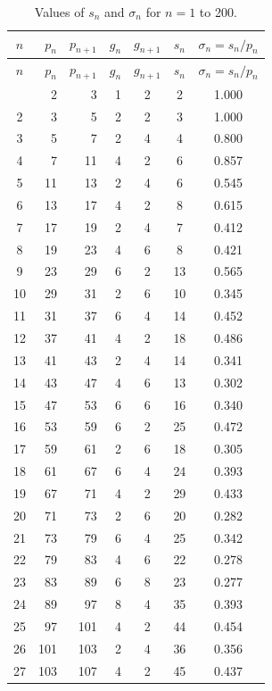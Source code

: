 \documentclass[12pt]{article}
\theoremstyle{plain}
\theoremstyle{definition}
\theoremstyle{remark}
\begin{document}
\begin{center}
\begin{small}
\begin{longtable}{@{}crrrccc@{}}
\caption{Values of $s_n$ and $\sigma_n$ for $n=1$ to 200.} \label{tab:data} \\
\toprule
$n$ & $p_n$ & $p_{n+1}$ & $g_n$ & $g_{n+1}$ & $s_n$ & $\sigma_n = s_n/p_n$ \\
\midrule
\endfirsthead
\toprule
$n$ & $p_n$ & $p_{n+1}$ & $g_n$ & $g_{n+1}$ & $s_n$ & $\sigma_n = s_n/p_n$ \\
\midrule
\endhead
\bottomrule
\endfoot
1 & 2 & 3 & 1 & 2 & 2 & 1.000 \\
2 & 3 & 5 & 2 & 2 & 3 & 1.000 \\
3 & 5 & 7 & 2 & 4 & 4 & 0.800 \\
4 & 7 & 11 & 4 & 2 & 6 & 0.857 \\
5 & 11 & 13 & 2 & 4 & 6 & 0.545 \\
6 & 13 & 17 & 4 & 2 & 8 & 0.615 \\
7 & 17 & 19 & 2 & 4 & 7 & 0.412 \\
8 & 19 & 23 & 4 & 6 & 8 & 0.421 \\
9 & 23 & 29 & 6 & 2 & 13 & 0.565 \\
10 & 29 & 31 & 2 & 6 & 10 & 0.345 \\
11 & 31 & 37 & 6 & 4 & 14 & 0.452 \\
12 & 37 & 41 & 4 & 2 & 18 & 0.486 \\
13 & 41 & 43 & 2 & 4 & 14 & 0.341 \\
14 & 43 & 47 & 4 & 6 & 13 & 0.302 \\
15 & 47 & 53 & 6 & 6 & 16 & 0.340 \\
16 & 53 & 59 & 6 & 2 & 25 & 0.472 \\
17 & 59 & 61 & 2 & 6 & 18 & 0.305 \\
18 & 61 & 67 & 6 & 4 & 24 & 0.393 \\
19 & 67 & 71 & 4 & 2 & 29 & 0.433 \\
20 & 71 & 73 & 2 & 6 & 20 & 0.282 \\
21 & 73 & 79 & 6 & 4 & 25 & 0.342 \\
22 & 79 & 83 & 4 & 6 & 22 & 0.278 \\
23 & 83 & 89 & 6 & 8 & 23 & 0.277 \\
24 & 89 & 97 & 8 & 4 & 35 & 0.393 \\
25 & 97 & 101 & 4 & 2 & 44 & 0.454 \\
26 & 101 & 103 & 2 & 4 & 36 & 0.356 \\
27 & 103 & 107 & 4 & 2 & 45 & 0.437 \\

\end{longtable}
\end{small}
\end{center}
\end{document}
